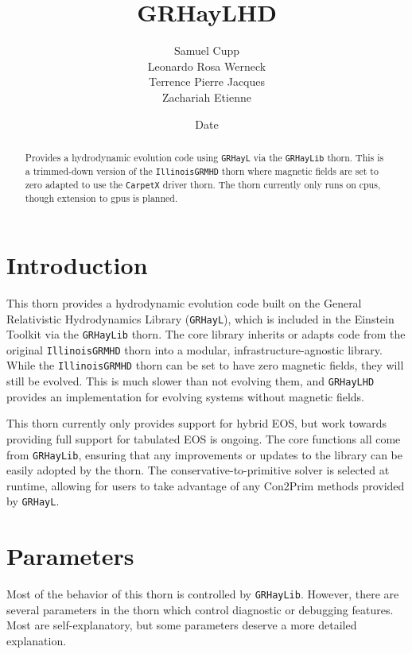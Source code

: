\documentclass{article}
\newcommand{\grhayl}{\texttt{GRHayL}\xspace}
\newcommand{\glib}{\texttt{GRHayLib}\xspace}
\newcommand{\ghd}{\texttt{GRHayLHD}\xspace}
\newcommand{\igm}{\texttt{IllinoisGRMHD}\xspace}
\begin{document}
\title{GRHayLHD}
\author{Samuel Cupp \\ Leonardo Rosa Werneck \\ Terrence Pierre Jacques \\ Zachariah Etienne}
\date{$ $Date$ $}

\maketitle


\begin{abstract}
Provides a hydrodynamic evolution code using \grhayl via the
\glib thorn. This is a trimmed-down version of the \igm thorn
where magnetic fields are set to zero adapted to use the
\texttt{CarpetX} driver thorn. The thorn currently only
runs on cpus, though extension to gpus is planned.
\end{abstract}

\section{Introduction}

This thorn provides a hydrodynamic evolution code built on
the General Relativistic Hydrodynamics Library (\grhayl),
which is included in the Einstein Toolkit via the \glib
thorn. The core library inherits or adapts code from the
original \igm thorn into a modular, infrastructure-agnostic
library. While the \igm thorn can be set to have
zero magnetic fields, they will still be evolved. This
is much slower than not evolving them, and \ghd provides an
implementation for evolving systems without magnetic
fields.

This thorn currently only provides support for hybrid EOS, but
work towards providing full support for tabulated EOS is ongoing.
 The core functions all come from \glib,
ensuring that any improvements or updates to the library can
be easily adopted by the thorn. The conservative-to-primitive
solver is selected at runtime, allowing for users to take
advantage of any Con2Prim methods provided by \grhayl.

\section{Parameters}

Most of the behavior of this thorn is controlled by \glib. However,
there are several parameters in the thorn which control diagnostic
or debugging features. Most are self-explanatory, but some parameters
deserve a more detailed explanation.
\end{document}
